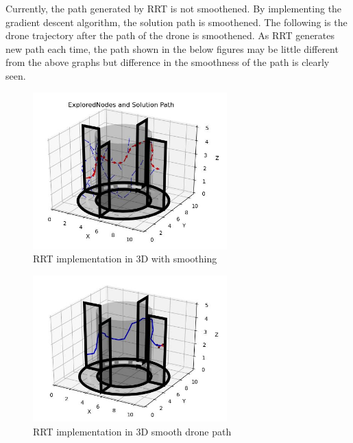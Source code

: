 \documentclass{IEEEtran}
\begin{document}
\newline 
Currently, the path generated by RRT is not smoothened. By implementing the gradient descent algorithm, the solution path is smoothened. The following is the drone trajectory after the path of the drone is smoothened. As RRT generates new path each time, the path shown in the below figures may be little different from the above graphs but difference in the smoothness of the path is clearly seen.
\newpage
\begin{figure}[h]
    \centering
    \includegraphics[width=7.5cm]{rrt3dsmooth}
    \caption{RRT implementation in 3D with smoothing}
    \label{fig:RRT implementation in 3D with smoothing}
\end{figure}

\begin{figure}[h]
    \centering
    \includegraphics[width=7.5cm]{rrt3dsmoothdrone}
    \caption{RRT implementation in 3D smooth drone path}
    \label{fig:RRT implementation in 3D smooth drone path}
\end{figure}
\end{document}
